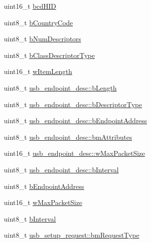 \begin{DoxyCompactItemize}
\item 
uint16\-\_\-t \hyperlink{group___p_i_o_s___u_s_b___d_e_f_s_gacf09c753851ce018b81a07325bda9d8e}{bcd\-H\-I\-D}
\item 
uint8\-\_\-t \hyperlink{group___p_i_o_s___u_s_b___d_e_f_s_ga969a604033b72573d59a740badf6920e}{b\-Country\-Code}
\item 
uint8\-\_\-t \hyperlink{group___p_i_o_s___u_s_b___d_e_f_s_ga86ff434026085d9c0c751185eb3700c5}{b\-Num\-Descriptors}
\item 
uint8\-\_\-t \hyperlink{group___p_i_o_s___u_s_b___d_e_f_s_ga66fbce7af1dc0d0340807d24f01187bb}{b\-Class\-Descriptor\-Type}
\item 
uint16\-\_\-t \hyperlink{group___p_i_o_s___u_s_b___d_e_f_s_ga98316a0d3fa2f9df4b6c5315b3f4c48d}{w\-Item\-Length}
\item 
uint8\-\_\-t \hyperlink{group___p_i_o_s___u_s_b___d_e_f_s_ga3daed87cea9dc19fad38317f997d0623}{usb\-\_\-endpoint\-\_\-desc\-::b\-Length}
\item 
uint8\-\_\-t \hyperlink{group___p_i_o_s___u_s_b___d_e_f_s_gac7354b96862dc19507c70b22d8f6da99}{usb\-\_\-endpoint\-\_\-desc\-::b\-Descriptor\-Type}
\item 
uint8\-\_\-t \hyperlink{group___p_i_o_s___u_s_b___d_e_f_s_ga8ad9f61bd28c162a904025d1c3df16fb}{usb\-\_\-endpoint\-\_\-desc\-::b\-Endpoint\-Address}
\item 
uint8\-\_\-t \hyperlink{group___p_i_o_s___u_s_b___d_e_f_s_gae9b9321924c915afb3ae2b6849b1d86c}{usb\-\_\-endpoint\-\_\-desc\-::bm\-Attributes}
\item 
uint16\-\_\-t \hyperlink{group___p_i_o_s___u_s_b___d_e_f_s_gabf689a07ed6891470fe9f48ea36ccd02}{usb\-\_\-endpoint\-\_\-desc\-::w\-Max\-Packet\-Size}
\item 
uint8\-\_\-t \hyperlink{group___p_i_o_s___u_s_b___d_e_f_s_ga7d36b247562b49fe4cc7824d9ee0894e}{usb\-\_\-endpoint\-\_\-desc\-::b\-Interval}
\item 
uint8\-\_\-t \hyperlink{group___p_i_o_s___u_s_b___d_e_f_s_ga527afb0f25cdd442d8d32c7df8e18c45}{b\-Endpoint\-Address}
\item 
uint16\-\_\-t \hyperlink{group___p_i_o_s___u_s_b___d_e_f_s_gabcc8edb1d5094ce6a16b42c1a7ae67d8}{w\-Max\-Packet\-Size}
\item 
uint8\-\_\-t \hyperlink{group___p_i_o_s___u_s_b___d_e_f_s_gaff92277eea8536f7de1a88d818c91b9e}{b\-Interval}
\item 
uint8\-\_\-t \hyperlink{group___p_i_o_s___u_s_b___d_e_f_s_ga6724d6067f78659da89e2abac5040207}{usb\-\_\-setup\-\_\-request\-::bm\-Request\-Type}

\end{DoxyCompactItemize}
